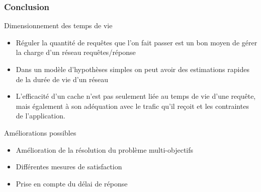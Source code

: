 \begin{frame}\frametitle{Conclusion}

  \begin{alertblock}{Dimensionnement des temps de vie}

    \begin{itemize}

      \item Réguler la quantité de requêtes que l'on fait passer est un bon moyen de gérer la charge d'un réseau requêtes/réponse

      \item Dans un modèle d'hypothèses simples on peut avoir des estimations rapides de la durée de vie d'un réseau

      \item L'efficacité d'un cache n'est pas seulement liée au temps de vie d'une requête, mais également à son adéquation avec le trafic qu'il reçoit et les contraintes de l'application.

    \end{itemize}

  \end{alertblock}

  \begin{block}{Améliorations possibles}
    \begin{itemize}
      \item Amélioration de la résolution du problème multi-objectifs
      \item Différentes mesures de satisfaction
      \item Prise en compte du délai de réponse
    \end{itemize}
  \end{block}


\end{frame}

